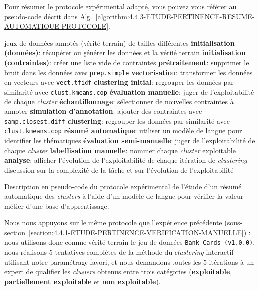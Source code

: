 			Pour résumer le protocole expérimental adapté, vous pouvez vous référer au pseudo-code décrit dans Alg.~\ref{algorithm:4.4.3-ETUDE-PERTINENCE-RESUME-AUTOMATIQUE-PROTOCOLE}.
			\begin{algorithm}[!htb]
				\begin{algorithmic}[1]
					\Require jeux de données annotés (vérité terrain) de tailles différentes
					\State \textbf{initialisation (données)}: récupérer ou générer les données et la vérité terrain
					\State \textbf{initialisation (contraintes)}: créer une liste vide de contraintes
					\State \textbf{prétraitement}: supprimer le bruit dans les données avec \texttt{prep.simple}
					\State \textbf{vectorisation}: transformer les données en vecteurs avec \texttt{vect.tfidf}
					\State \textbf{clustering initial}: regrouper les données par similarité avec \texttt{clust.kmeans.cop}
					\State \textbf{évaluation manuelle}: juger de l'exploitabilité de chaque \textit{cluster}
					\Repeat
						\State \textbf{échantillonnage}: sélectionner de nouvelles contraintes à annoter
						\State \textbf{simulation d'annotation}: ajouter des contraintes avec \texttt{samp.closest.diff}
						\State \textbf{clustering}: regrouper les données par similarité avec \texttt{clust.kmeans.cop}
						\State \textbf{résumé automatique}: utiliser un modèle de langue pour identifier les thématiques
						\State \textbf{évaluation semi-manuelle}: juger de l'exploitabilité de chaque \textit{cluster}
						\State \textbf{labellisation manuelle}: nommer chaque \textit{cluster} exploitable
					\State \textbf{analyse}: afficher l'évolution de l'exploitabilité de chaque itération de \textit{clustering}
					\Ensure discussion sur la complexité de la tâche et sur l'évolution de l'exploitabilité
				\end{algorithmic}
				\caption{Description en pseudo-code du protocole expérimental de l'étude d'un résumé automatique des \textit{clusters} à l'aide d'un modèle de langue pour vérifier la valeur métier d'une base d'apprentissage.}
				\label{algorithm:4.4.3-ETUDE-PERTINENCE-RESUME-AUTOMATIQUE-PROTOCOLE}
			\end{algorithm}
			
			Nous nous appuyons sur le même protocole que l'expérience précédente (sous-section~\ref{section:4.4.1-ETUDE-PERTINENCE-VERIFICATION-MANUELLE}) : nous utilisons donc comme vérité terrain le jeu de données \texttt{Bank Cards (v1.0.0)}, nous réalisons $5$ tentatives complètes de la méthode du \textit{clustering} interactif utilisant notre paramétrage favori, et nous demandons toutes les $5$ itérations à un expert de qualifier les \textit{clusters} obtenus entre trois catégories (\textbf{exploitable}, \textbf{partiellement exploitable} et \textbf{non exploitable}).
			
